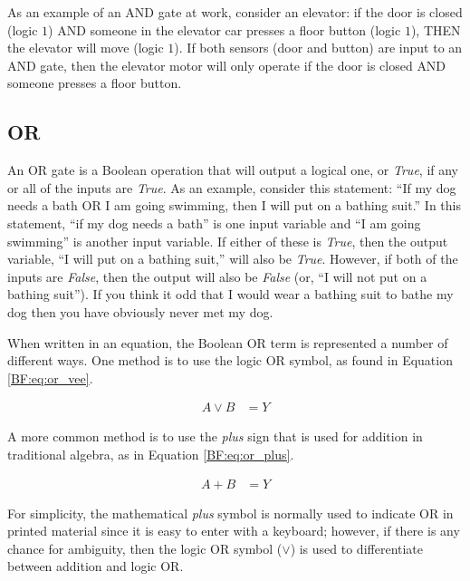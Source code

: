 As an example of an \textsf{AND}  gate at work, consider an elevator: if the door is closed (logic $ 1 $) \textsf{AND} someone in the elevator car presses a floor button (logic $ 1 $), THEN the elevator will move (logic $ 1 $). If both sensors (door and button) are input to an \textsf{AND}  gate, then the elevator motor will only operate if the door is closed \textsf{AND}  someone presses a floor button. 

\subsection{OR}
\label{BF:subsec:or}

An \textsf{OR}  gate is a Boolean operation that will output a logical one, or \emph{True}, if any or all of the inputs are \emph{True}. As an example, consider this statement: ``If my dog needs a bath OR I am going swimming, then I will put on a bathing suit.'' In this statement, ``if my dog needs a bath'' is one input variable and ``I am going swimming'' is another input variable. If either of these is \emph{True}, then the output variable, ``I will put on a bathing suit,'' will also be \emph{True}. However, if both of the inputs are \emph{False}, then the output will also be \emph{False} (or, ``I will not put on a bathing suit''). If you think it odd that I would wear a bathing suit to bathe my dog then you have obviously never met my dog. 

When written in an equation, the Boolean \textsf{OR}  term is represented a number of different ways. One method is to use the logic \textsf{OR}  symbol, as found in Equation \ref{BF:eq:or_vee}.

\begin{align}
  \label{BF:eq:or_vee}
  A \vee B &= Y 
\end{align}

A more common method is to use the \emph{plus} sign that is used for addition in traditional algebra, as in Equation \ref{BF:eq:or_plus}.

\begin{align}
  \label{BF:eq:or_plus}
  A + B &= Y 
\end{align}

For simplicity, the mathematical \emph{plus} symbol is normally used to indicate \textsf{OR}  in printed material since it is easy to enter with a keyboard; however, if there is any chance for ambiguity, then the logic \textsf{OR}  symbol ($ \vee $) is used to differentiate between addition and logic \textsf{OR}.

